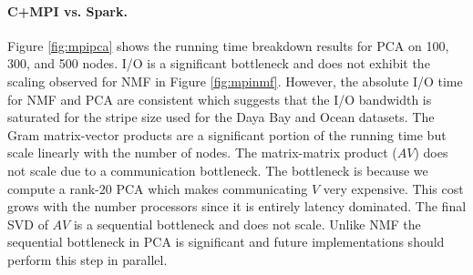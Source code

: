 \paragraph{C+MPI vs. Spark.}
Figure \ref{fig:mpipca} shows the running time breakdown results for PCA on 100, 300, and 500 nodes. I/O is a significant bottleneck and does not exhibit the scaling observed for NMF in Figure \ref{fig:mpinmf}. However, the absolute I/O time for NMF and PCA are consistent which suggests that the I/O bandwidth is saturated for the stripe size used for the Daya Bay and Ocean datasets. The Gram matrix-vector products are a significant portion of the running time but scale linearly with the number of nodes. The matrix-matrix product ($AV$) does not scale due to a communication bottleneck. The bottleneck is because we compute a rank-$20$ PCA which makes communicating $V$ very expensive. This cost grows with the number processors since it is entirely latency dominated. The final SVD of $AV$ is a sequential bottleneck and does not scale. Unlike NMF the sequential bottleneck in PCA is significant and future implementations should perform this step in parallel.

